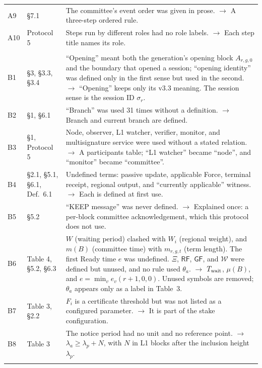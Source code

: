 \documentclass[11pt,a4paper]{article}
\newcommand{\Chg}[1]{\leavevmode\hypertarget{chg:#1}{#1}}
\newcommand{\Twait}{T_{\rm wait}}
\newcounter{protocol}
\begin{document}
\begin{xltabular}{\linewidth}{@{}>{\raggedright\arraybackslash}p{.05\linewidth}>{\raggedright\arraybackslash}p{.17\linewidth}Y@{}}
\Chg{A9} & \S7.1 & The committee's event order was given in prose. $\rightarrow$ A three-step ordered rule.\\
\Chg{A10} & Protocol 5 & Steps run by different roles had no role labels. $\rightarrow$ Each step title names its role.\\
\\
\Chg{B1} & \S3, \S3.3, \S3.4 & ``Opening'' meant both the generation's opening block $A_{r,g,0}$ and the boundary that opened a session; ``opening identity'' was defined only in the first sense but used in the second. $\rightarrow$ ``Opening'' keeps only its v3.3 meaning. The session sense is the session ID $\sigma_r$.\\
\Chg{B2} & \S1, \S6.1 & ``Branch'' was used 31 times without a definition. $\rightarrow$ Branch and current branch are defined.\\
\Chg{B3} & \S1, Protocol 5 & Node, observer, L1 watcher, verifier, monitor, and multisignature service were used without a stated relation. $\rightarrow$ A participants table; ``L1 watcher'' became ``node'', and ``monitor'' became ``committee''.\\
\Chg{B4} & \S2.1, \S5.1, \S6.1, Def.~6.1 & Undefined terms: passive update, applicable Force, terminal receipt, regional output, and ``currently applicable'' witness. $\rightarrow$ Each is defined at first use.\\
\Chg{B5} & \S5.2 & ``KEEP message'' was never defined. $\rightarrow$ Explained once: a per-block committee acknowledgement, which this protocol does not use.\\
\Chg{B6} & Table 4, \S5.2, \S6.3 & $W$ (waiting period) clashed with $W_i$ (regional weight), and $m(B)$ (committee time) with $m_{r,g,t}$ (term length). The first Ready time $e$ was undefined. $\Xi$, $\mathsf{RF}$, $\mathsf{GF}$, and $\mathcal W$ were defined but unused, and no rule used $\theta_a$. $\rightarrow$ $\Twait$, $\mu(B)$, and $e=\min_v e_v(r+1,0,0)$. Unused symbols are removed; $\theta_a$ appears only as a label in Table~3.\\
\Chg{B7} & Table 3, \S2.2 & $F_i$ is a certificate threshold but was not listed as a configured parameter. $\rightarrow$ It is part of the stake configuration.\\
\Chg{B8} & Table 3 & The notice period had no unit and no reference point. $\rightarrow$ $\lambda_a\ge\lambda_p+N$, with $N$ in L1 blocks after the inclusion height $\lambda_p$.\\
\\

\end{xltabular}
\end{document}
